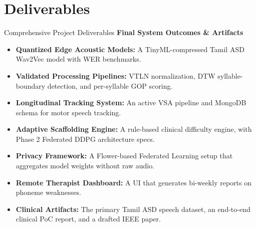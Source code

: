 \documentclass[aspectratio=169, 11pt, xcolor=table]{beamer}
\begin{document}
\section{Deliverables}
\begin{frame}{Comprehensive Project Deliverables}
    \vspace{-2mm}
    {\large \textbf{\textcolor{amritaMaroon}{Final System Outcomes \& Artifacts}}}\\
    \vspace{2mm}
    \footnotesize
    \begin{itemize}
        \setlength{\itemsep}{4pt}
        \item \textbf{Quantized Edge Acoustic Models:} A TinyML-compressed Tamil ASD Wav2Vec model with WER benchmarks.
        \item \textbf{Validated Processing Pipelines:} VTLN normalization, DTW syllable-boundary detection, and per-syllable GOP scoring.
        \item \textbf{Longitudinal Tracking System:} An active VSA pipeline and MongoDB schema for motor speech tracking.
        \item \textbf{Adaptive Scaffolding Engine:} A rule-based clinical difficulty engine, with Phase 2 Federated DDPG architecture specs.
        \item \textbf{Privacy Framework:} A Flower-based Federated Learning setup that aggregates model weights without raw audio.
        \item \textbf{Remote Therapist Dashboard:} A UI that generates bi-weekly reports on phoneme weaknesses.
        \item \textbf{Clinical Artifacts:} The primary Tamil ASD speech dataset, an end-to-end clinical PoC report, and a drafted IEEE paper.
    \end{itemize}
\end{frame}
\end{document}

